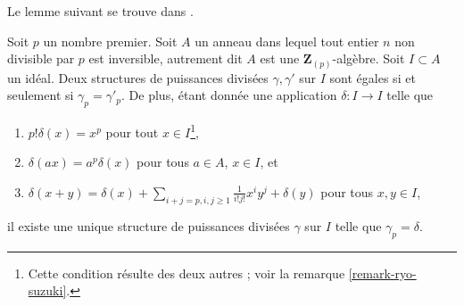 \noindent
Le lemme suivant se trouve dans \cite{BO}.

\begin{lemma}
\label{lemma-need-only-gamma-p}
Soit $p$ un nombre premier. Soit $A$ un anneau dans lequel tout entier $n$
non divisible par $p$ est inversible, autrement dit $A$ est une
$\mathbf{Z}_{(p)}$-algèbre. Soit $I \subset A$ un idéal. Deux structures de
puissances divisées $\gamma, \gamma'$ sur $I$ sont égales si et seulement si
$\gamma_p = \gamma'_p$. De plus, étant donnée une application
$\delta : I \to I$ telle que
\begin{enumerate}
\item $p!\delta(x) = x^p$ pour tout $x \in I$\footnote{Cette condition
résulte des deux autres ; voir la remarque \ref{remark-ryo-suzuki}.},
\item $\delta(ax) = a^p\delta(x)$ pour tous $a \in A$, $x \in I$, et
\item
$\delta(x + y) =
\delta(x) +
\sum\nolimits_{i + j = p, i,j \geq 1} \frac{1}{i!j!} x^i y^j +
\delta(y)$ pour tous $x, y \in I$,
\end{enumerate}
il existe une unique structure de puissances divisées $\gamma$ sur $I$ telle
que $\gamma_p = \delta$.
\end{lemma}

